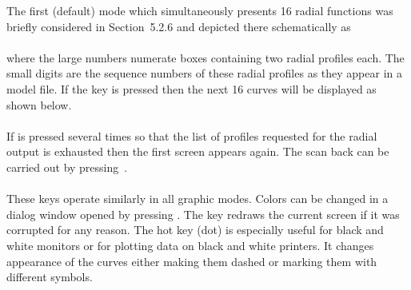 The first (default) mode which simultaneously presents 16 radial
functions was briefly considered in Section~5.2.6 and depicted there
schematically as 
\bigskip\\ 
\\[2ex]
where the large numbers numerate boxes containing two radial profiles
each. 
The small digits are the sequence numbers of these radial profiles as
they appear in a model file.
If the key  is pressed then the next 16 curves will be
displayed as shown below.
\bigskip\\ 
\\[2ex]
If  is pressed several times so that the list of profiles
requested for the radial output is exhausted then the first screen
appears again. 
The scan back can be carried out by pressing~.
\\[2ex]
\\[2ex]
These keys operate similarly in all graphic modes. 
Colors can be changed in a dialog window opened by pressing .
The key  redraws the current screen if it was corrupted for
any reason.
The hot key  (dot) is especially useful for black and white
monitors or for plotting data on black and white printers. 
It changes appearance of the curves either making them dashed or marking
them with different symbols.

